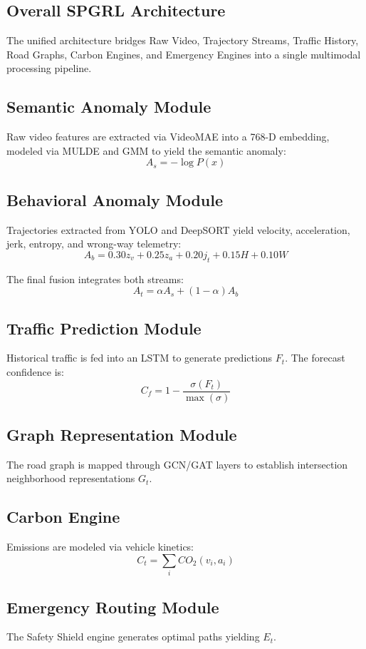 \documentclass[journal]{IEEEtran}
\begin{document}
\subsection{Overall SPGRL Architecture}
The unified architecture bridges Raw Video, Trajectory Streams, Traffic History, Road Graphs, Carbon Engines, and Emergency Engines into a single multimodal processing pipeline.

\subsection{Semantic Anomaly Module}
Raw video features are extracted via VideoMAE into a 768-D embedding, modeled via MULDE and GMM to yield the semantic anomaly:
$$ A_s = -\log P(x) $$

\subsection{Behavioral Anomaly Module}
Trajectories extracted from YOLO and DeepSORT yield velocity, acceleration, jerk, entropy, and wrong-way telemetry:
$$ A_b = 0.30z_v + 0.25z_a + 0.20j_t + 0.15H + 0.10W $$

The final fusion integrates both streams:
$$ A_t = \alpha A_s + (1-\alpha) A_b $$

\subsection{Traffic Prediction Module}
Historical traffic is fed into an LSTM to generate predictions $F_t$. The forecast confidence is:
$$ C_f = 1 - \frac{\sigma(F_t)}{\max(\sigma)} $$

\subsection{Graph Representation Module}
The road graph is mapped through GCN/GAT layers to establish intersection neighborhood representations $G_t$.

\subsection{Carbon Engine}
Emissions are modeled via vehicle kinetics:
$$ C_t = \sum_i CO_2(v_i, a_i) $$

\subsection{Emergency Routing Module}
The Safety Shield engine generates optimal paths yielding $E_t$.
\end{document}
